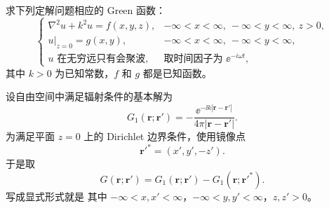 \begin{question}[15分]

求下列定解问题相应的 Green 函数：
\[
\begin{cases}
\nabla^2u+k^2u=f(x,y,z), & -\infty<x<\infty,\ -\infty<y<\infty,\ z>0,\\[4pt]
u|_{z=0}=g(x,y), & -\infty<x<\infty,\ -\infty<y<\infty,\\[4pt]
u \text{ 在无穷远只有会聚波}, & \text{取时间因子为 } \ee^{-i\omega t},
\end{cases}
\]
其中 $k>0$ 为已知常数，$f$ 和 $g$ 都是已知函数。

\begin{solution}

设自由空间中满足辐射条件的基本解为
\[
G_1(\mathbf r;\mathbf r')=-\frac{\ee^{-\ii k|\mathbf r-\mathbf r'|}}{4\pi|\mathbf r-\mathbf r'|}.
\]
为满足平面 $z=0$ 上的 Dirichlet 边界条件，使用镜像点
\[
\mathbf r'^*=(x',y',-z').
\]
于是取
\[
G(\mathbf r;\mathbf r')=G_1(\mathbf r;\mathbf r')-G_1(\mathbf r;\mathbf r'^*).
\]
写成显式形式就是
其中 $-\infty<x,x'<\infty$，$-\infty<y,y'<\infty$，$z,z'>0$。

\end{solution}
\end{question}

